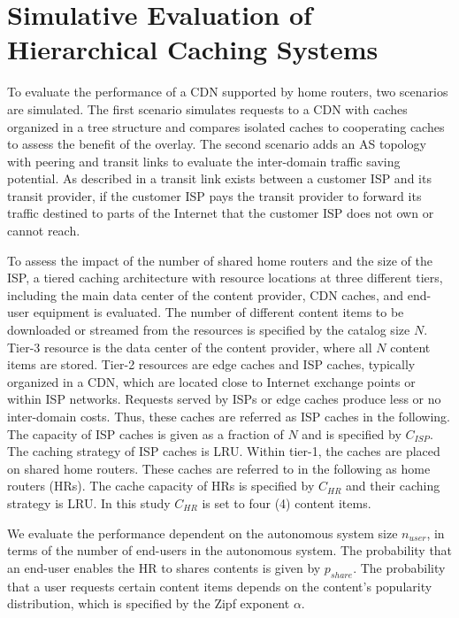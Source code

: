 \section{Simulative Evaluation of Hierarchical Caching Systems}\label{sec:hierarchical:simulative:simulative}

To evaluate the performance of a CDN supported by home routers, two scenarios are simulated. The first scenario simulates requests to a CDN with caches organized in a tree structure and compares isolated caches to cooperating caches to assess the benefit of the overlay.
The second scenario adds an AS topology with peering and transit links to evaluate the inter-domain traffic saving potential. As described in  a transit link exists between a customer ISP and its transit provider, if the customer ISP pays the transit provider to forward its traffic destined to parts of the Internet that the customer ISP does not own or cannot reach.


To assess the impact of the number of shared home routers and the size of the ISP, a tiered caching architecture with resource locations at three different tiers, including the main data center of the content provider, CDN caches, and end-user equipment is evaluated.
The number of different content items to be downloaded or streamed from the resources is specified by the catalog size $N$. Tier-3 resource is the data center of the content provider, where all $N$ content items are stored. Tier-2 resources are edge caches and ISP caches, typically organized in a CDN, which are located close to Internet exchange points or within ISP networks. Requests served by ISPs or edge caches produce less or no inter-domain costs. Thus, these caches are referred as ISP caches in the following. The capacity of ISP caches is given as a fraction of $N$ and is specified by $C_{ISP}$. The caching strategy of ISP caches is LRU.
Within tier-1, the caches are placed on shared home routers. These caches are referred to in the following as home routers (HRs). The cache capacity of HRs is specified by $C_{HR}$ and their caching strategy is LRU. In this study $C_{HR}$ is set to four (4) content items.

We evaluate the performance dependent on the autonomous system size $n_{user}$, in terms of the number of end-users in the autonomous system. The probability that an end-user enables the HR to shares contents is given by $p_{share}$. The probability that a user requests certain content items depends on the content's popularity distribution, which is specified by the Zipf exponent $\alpha$.

